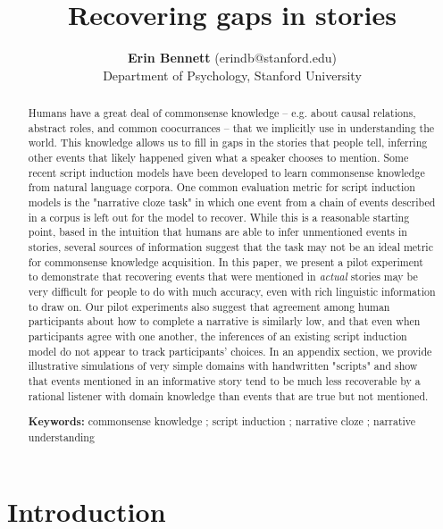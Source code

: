 \documentclass[10pt,a4paper]{article}
\title{Recovering gaps in stories}
\author{{\large \bf Erin Bennett} (erindb@stanford.edu) \\ %
  Department of Psychology, Stanford University}
\begin{document}
\maketitle


\begin{abstract}

Humans have a great deal of commonsense knowledge -- e.g. about causal relations, abstract roles, and common coocurrances -- that we implicitly use in understanding the world.
This knowledge allows us to fill in gaps in the stories that people tell, inferring other events that likely happened given what a speaker chooses to mention.
Some recent script induction models have been developed to learn commonsense knowledge from natural language corpora.
One common evaluation metric for script induction models is the "narrative cloze task" in which one event from a chain of events described in a corpus is left out for the model to recover.
While this is a reasonable starting point, based in the intuition that humans are able to infer unmentioned events in stories, several sources of information suggest that the task may not be an ideal metric for commonsense knowledge acquisition.
In this paper, we present a pilot experiment to demonstrate that recovering events that were mentioned in {\em actual} stories may be very difficult for people to do with much accuracy, even with rich linguistic information to draw on.
Our pilot experiments also suggest that agreement among human participants about how to complete a narrative is similarly low, and that even when participants agree with one another, the inferences of an existing script induction model do not appear to track participants' choices.
In an appendix section, we provide illustrative simulations of very simple domains with handwritten "scripts" and show that events mentioned in an informative story tend to be much less recoverable by a rational listener with domain knowledge than events that are true but not mentioned.

\textbf{Keywords:} 
commonsense knowledge ; script induction ; narrative cloze ; narrative understanding
\end{abstract}

\section{Introduction}
\end{document}
